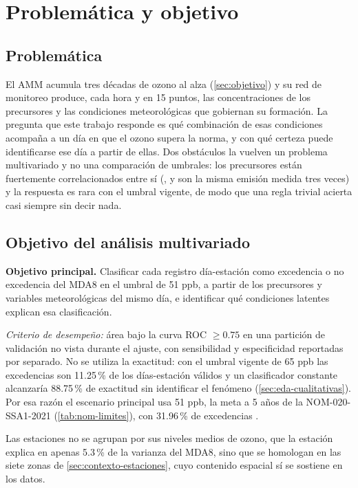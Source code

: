 \section{Problemática y objetivo}
\label{sec:objetivo-tecnicas}

\subsection{Problemática}

El AMM acumula tres décadas de ozono al alza (\cref{sec:objetivo}) y su red
de monitoreo produce, cada hora y en 15 puntos, las concentraciones de los
precursores y las condiciones meteorológicas que gobiernan su formación. La
pregunta que este trabajo responde es qué combinación de esas condiciones
acompaña a un día en que el ozono supera la norma, y con qué certeza puede
identificarse ese día a partir de ellas. Dos obstáculos la vuelven un
problema multivariado y no una comparación de umbrales: los precursores
están fuertemente correlacionados entre sí (,  y  son
la misma emisión medida tres veces) y la respuesta es rara con el umbral
vigente, de modo que una regla trivial acierta casi siempre sin decir nada.

\subsection{Objetivo del análisis multivariado}
\label{sec:obj:objetivo}

\textbf{Objetivo principal.} Clasificar cada registro día-estación como
excedencia o no excedencia del MDA8 en el umbral de 51 ppb, a partir de los
precursores y variables meteorológicas del mismo día, e identificar qué
condiciones latentes explican esa clasificación.

\textit{Criterio de desempeño:} área bajo la curva ROC $\geq 0.75$ en una
partición de validación no vista durante el ajuste, con sensibilidad y
especificidad reportadas por separado. No se utiliza la exactitud: con el
umbral vigente de 65 ppb las excedencias son 11.25\,\% de los días-estación
válidos y un clasificador constante alcanzaría 88.75\,\% de exactitud sin
identificar el fenómeno (\cref{sec:eda-cualitativas}). Por esa razón el
escenario principal usa 51 ppb, la meta a 5 años de la NOM-020-SSA1-2021
(\cref{tab:nom-limites}), con 31.96\,\% de excedencias \parencite{saito2015}.

Las estaciones no se agrupan por sus niveles medios de ozono, que la
estación explica en apenas 5.3\,\% de la varianza del MDA8, sino que se
homologan en las siete zonas de \cref{sec:contexto-estaciones}, cuyo
contenido espacial sí se sostiene en los datos.

